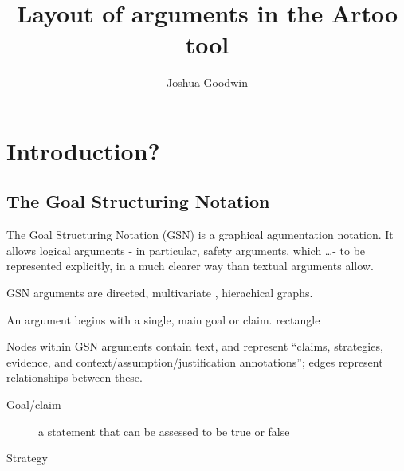 \documentclass[authoryearcitations]{UoYCSproject}
\author{Joshua Goodwin}
\title{Layout of arguments in the Artoo tool}
\begin{document}
\maketitle





\chapter{Introduction?}


\section{The Goal Structuring Notation}

The Goal Structuring Notation (GSN) is a graphical agumentation notation.
It allows logical arguments - in particular, safety arguments, which \ldots  - to be represented explicitly, in a much clearer way than textual arguments allow.

GSN arguments are directed, multivariate , hierachical graphs.

An argument begins with a single, main goal or claim. rectangle

Nodes within GSN arguments contain text, and represent ``claims, strategies, evidence, and context/assumption/justification annotations'';
edges represent relationships between these.

\begin{description}
    \item[Goal/claim]
    a statement that can be assessed to be true or false
    \item[Strategy]
\end{description}
\end{document}
